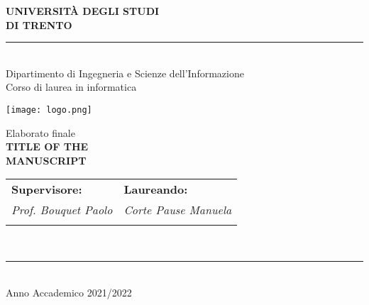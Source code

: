 \documentclass[a4paper,12pt,openright,notitlepage,twoside]{book}
\begin{document}
\thispagestyle{empty} 	%
\begin{center}
{\LARGE \bf UNIVERSITÀ DEGLI STUDI}\\ \vspace{0.25cm}
{\LARGE \bf  DI TRENTO}
\vspace{-2mm}\rule{\textwidth}{0.4pt}\\[0.5cm]

{\Large Dipartimento di Ingegneria e Scienze dell'Informazione}\\[5pt]
{\Large Corso di laurea in informatica }\\[0.8cm]

\begin{center}
	\texttt{[image: logo.png]}
\end{center}

\vspace{1.7cm}
{\Large  Elaborato finale}\\[1cm] 
{\Large \bf TITLE OF THE}\\ \vspace{0.25cm}
{\Large \bf MANUSCRIPT}\\[3cm] 


\centering
\begin{tabular}{ll}
	\textbf{Supervisore:}      			\hspace{3cm}       	& \textbf{Laureando:}\\[5pt]
    \textit{Prof. Bouquet Paolo}     \hspace{5cm}       	& \textit{Corte Pause Manuela}\\[2pt]
															&
\end{tabular}\\
\vfill
\rule{\textwidth}{0.4pt}\\[5pt]

{\large Anno Accademico 2021/2022}\\[0.2cm]
\end{center}

%


\tableofcontents
\cleardoublepage

\mainmatter





\nocite{*}
  
  
\end{document}
